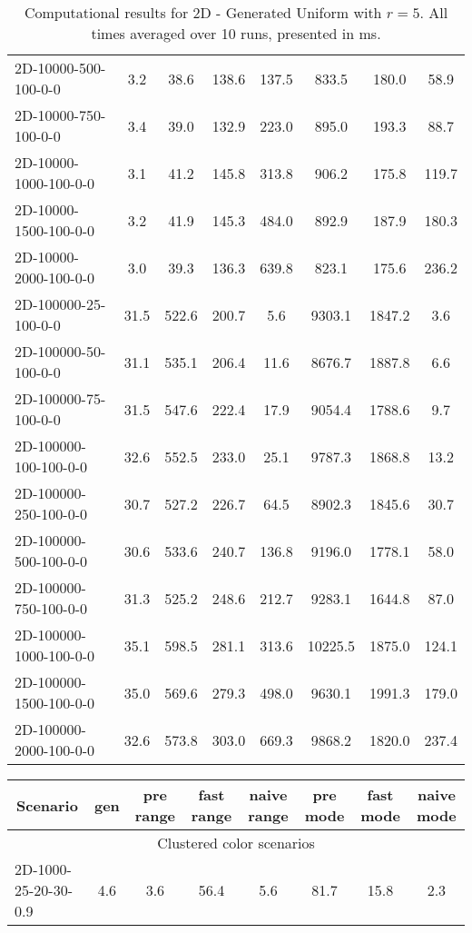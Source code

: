 \documentclass{article}
\begin{document}
\begin{center}
\begin{table}[h]
\begin{tabular}{|l||c|c|c|c|c|c|c|}
    2D-10000-500-100-0-0 & 3.2 & 38.6 & 138.6 & 137.5 & 833.5 & 180.0 & 58.9 \\
    2D-10000-750-100-0-0 & 3.4 & 39.0 & 132.9 & 223.0 & 895.0 & 193.3 & 88.7 \\
    2D-10000-1000-100-0-0 & 3.1 & 41.2 & 145.8 & 313.8 & 906.2 & 175.8 & 119.7 \\
    2D-10000-1500-100-0-0 & 3.2 & 41.9 & 145.3 & 484.0 & 892.9 & 187.9 & 180.3 \\
    2D-10000-2000-100-0-0 & 3.0 & 39.3 & 136.3 & 639.8 & 823.1 & 175.6 & 236.2 \\
    \hline
    2D-100000-25-100-0-0 & 31.5 & 522.6 & 200.7 & 5.6 & 9303.1 & 1847.2 & 3.6 \\
    2D-100000-50-100-0-0 & 31.1 & 535.1 & 206.4 & 11.6 & 8676.7 & 1887.8 & 6.6 \\
    2D-100000-75-100-0-0 & 31.5 & 547.6 & 222.4 & 17.9 & 9054.4 & 1788.6 & 9.7 \\
    2D-100000-100-100-0-0 & 32.6 & 552.5 & 233.0 & 25.1 & 9787.3 & 1868.8 & 13.2 \\
    2D-100000-250-100-0-0 & 30.7 & 527.2 & 226.7 & 64.5 & 8902.3 & 1845.6 & 30.7 \\
    2D-100000-500-100-0-0 & 30.6 & 533.6 & 240.7 & 136.8 & 9196.0 & 1778.1 & 58.0 \\
    2D-100000-750-100-0-0 & 31.3 & 525.2 & 248.6 & 212.7 & 9283.1 & 1644.8 & 87.0 \\
    2D-100000-1000-100-0-0 & 35.1 & 598.5 & 281.1 & 313.6 & 10225.5 & 1875.0 & 124.1 \\
    2D-100000-1500-100-0-0 & 35.0 & 569.6 & 279.3 & 498.0 & 9630.1 & 1991.3 & 179.0 \\
    2D-100000-2000-100-0-0 & 32.6 & 573.8 & 303.0 & 669.3 & 9868.2 & 1820.0 & 237.4 \\
    \hline
    \end{tabular}
    \caption{Computational results for 2D - Generated Uniform with $r=5$. All times averaged over 10 runs, presented in ms.}
\end{table}
\begin{table}[h]
    \hskip0.8cm
    \begin{tabular}{|l||c|c|c|c|c|c|c|}
    \hline
    \multicolumn{1}{|c|}{Scenario} & gen & pre range & fast range & naive range & pre mode & fast mode & naive mode  \\
    \hline
    \hline
    \multicolumn{8}{|c|}{Clustered color scenarios} \\
    \hline
    2D-1000-25-20-30-0.9 & 4.6 & 3.6 & 56.4 & 5.6 & 81.7 & 15.8 & 2.3 \\

\end{tabular}
\end{table}
\end{center}
\end{document}
